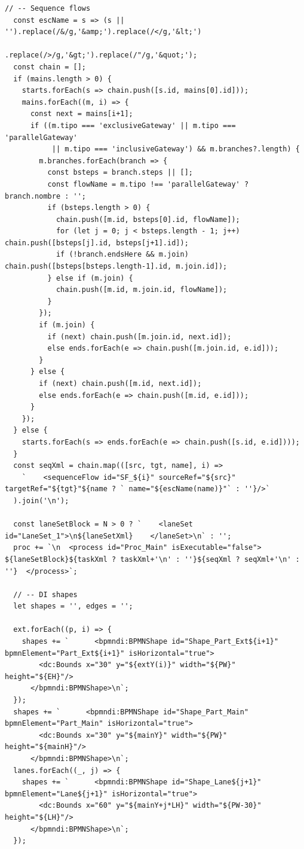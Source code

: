 \begin{lstlisting}[style=promptbox]
  // -- Sequence flows
  const escName = s => (s || '').replace(/&/g,'&amp;').replace(/</g,'&lt;')
                                 .replace(/>/g,'&gt;').replace(/"/g,'&quot;');
  const chain = [];
  if (mains.length > 0) {
    starts.forEach(s => chain.push([s.id, mains[0].id]));
    mains.forEach((m, i) => {
      const next = mains[i+1];
      if ((m.tipo === 'exclusiveGateway' || m.tipo === 'parallelGateway'
           || m.tipo === 'inclusiveGateway') && m.branches?.length) {
        m.branches.forEach(branch => {
          const bsteps = branch.steps || [];
          const flowName = m.tipo !== 'parallelGateway' ? branch.nombre : '';
          if (bsteps.length > 0) {
            chain.push([m.id, bsteps[0].id, flowName]);
            for (let j = 0; j < bsteps.length - 1; j++) chain.push([bsteps[j].id, bsteps[j+1].id]);
            if (!branch.endsHere && m.join) chain.push([bsteps[bsteps.length-1].id, m.join.id]);
          } else if (m.join) {
            chain.push([m.id, m.join.id, flowName]);
          }
        });
        if (m.join) {
          if (next) chain.push([m.join.id, next.id]);
          else ends.forEach(e => chain.push([m.join.id, e.id]));
        }
      } else {
        if (next) chain.push([m.id, next.id]);
        else ends.forEach(e => chain.push([m.id, e.id]));
      }
    });
  } else {
    starts.forEach(s => ends.forEach(e => chain.push([s.id, e.id])));
  }
  const seqXml = chain.map(([src, tgt, name], i) =>
    `    <sequenceFlow id="SF_${i}" sourceRef="${src}" targetRef="${tgt}"${name ? ` name="${escName(name)}"` : ''}/>`
  ).join('\n');

  const laneSetBlock = N > 0 ? `    <laneSet id="LaneSet_1">\n${laneSetXml}    </laneSet>\n` : '';
  proc += `\n  <process id="Proc_Main" isExecutable="false">
${laneSetBlock}${taskXml ? taskXml+'\n' : ''}${seqXml ? seqXml+'\n' : ''}  </process>`;

  // -- DI shapes
  let shapes = '', edges = '';

  ext.forEach((p, i) => {
    shapes += `      <bpmndi:BPMNShape id="Shape_Part_Ext${i+1}" bpmnElement="Part_Ext${i+1}" isHorizontal="true">
        <dc:Bounds x="30" y="${extY(i)}" width="${PW}" height="${EH}"/>
      </bpmndi:BPMNShape>\n`;
  });
  shapes += `      <bpmndi:BPMNShape id="Shape_Part_Main" bpmnElement="Part_Main" isHorizontal="true">
        <dc:Bounds x="30" y="${mainY}" width="${PW}" height="${mainH}"/>
      </bpmndi:BPMNShape>\n`;
  lanes.forEach((_, j) => {
    shapes += `      <bpmndi:BPMNShape id="Shape_Lane${j+1}" bpmnElement="Lane${j+1}" isHorizontal="true">
        <dc:Bounds x="60" y="${mainY+j*LH}" width="${PW-30}" height="${LH}"/>
      </bpmndi:BPMNShape>\n`;
  });


\end{lstlisting}
